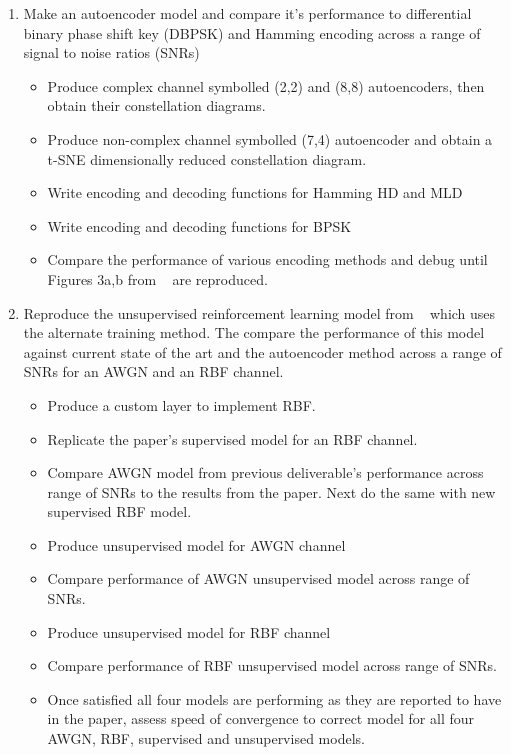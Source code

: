 \documentclass[12pt,onecolumn,letterpaper]{article}
\begin{document}
\begin{enumerate}
   \item Make an autoencoder model and compare it's performance to differential binary phase shift key (DBPSK) and Hamming encoding across a range of signal to noise ratios (SNRs)
   \begin{itemize}
      \item Produce complex channel symbolled (2,2) and (8,8) autoencoders, then obtain their constellation diagrams.
      \item Produce non-complex channel symbolled (7,4) autoencoder and obtain a t-SNE dimensionally reduced constellation diagram.
      \item Write encoding and decoding functions for Hamming HD and MLD
      \item Write encoding and decoding functions for BPSK
      \item Compare the performance of various encoding methods and debug until Figures 3a,b from ~\cite{oShea} are reproduced.
   \end{itemize}
   \item Reproduce the unsupervised reinforcement learning model from ~\cite{Aoudia} which uses the alternate training method. The compare the performance of this model against current state of the art and the autoencoder method across a range of SNRs for an AWGN and an RBF channel.
   \begin{itemize}
      \item Produce a custom layer to implement RBF.
      \item Replicate the paper's supervised model for an RBF channel.
      \item Compare AWGN model from previous deliverable's performance across range of SNRs to the results from the paper. Next do the same with new supervised RBF model.
      \item Produce unsupervised model for AWGN channel
      \item Compare performance of AWGN unsupervised model across range of SNRs.
      \item Produce unsupervised model for RBF channel
      \item Compare performance of RBF unsupervised model across range of SNRs.
      \item Once satisfied all four models are performing as they are reported to have in the paper, assess speed of convergence to correct model for all four AWGN, RBF, supervised and unsupervised models.
   \end{itemize}
\end{enumerate}
\end{document}
